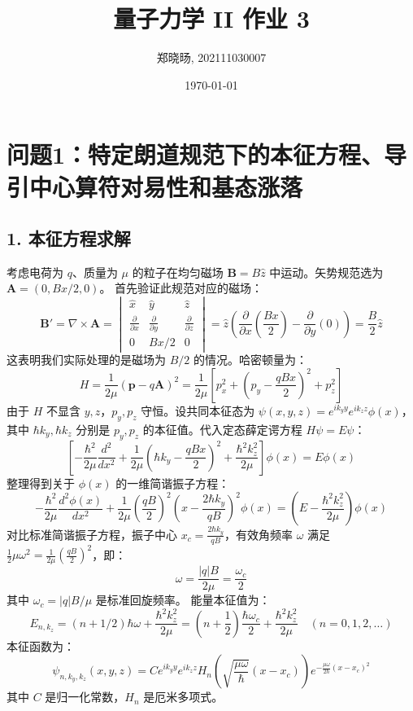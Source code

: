 \documentclass[12pt]{article}
\begin{document}
\title{量子力学 II 作业 3}
\author{郑晓旸, 202111030007}
\date{\today}
\maketitle
\section*{问题1：特定朗道规范下的本征方程、导引中心算符对易性和基态涨落}

\subsection*{1. 本征方程求解}
考虑电荷为 \(q\)、质量为 \(\mu\) 的粒子在均匀磁场 \(\mathbf{B} = B \hat{z}\) 中运动。矢势规范选为 \(\mathbf{A} = (0, Bx/2, 0)\)。
首先验证此规范对应的磁场：
\[
\mathbf{B'} = \nabla \times \mathbf{A} = \begin{vmatrix} \hat{x} & \hat{y} & \hat{z} \\ \frac{\partial}{\partial x} & \frac{\partial}{\partial y} & \frac{\partial}{\partial z} \\ 0 & Bx/2 & 0 \end{vmatrix} = \hat{z} \left( \frac{\partial}{\partial x} \left(\frac{Bx}{2}\right) - \frac{\partial}{\partial y}(0) \right) = \frac{B}{2} \hat{z}
\]
这表明我们实际处理的是磁场为 \(B/2\) 的情况。哈密顿量为：
\[
H = \frac{1}{2\mu} (\mathbf{p} - q\mathbf{A})^2 = \frac{1}{2\mu} \left[ p_x^2 + \left(p_y - \frac{qBx}{2}\right)^2 + p_z^2 \right]
\]
由于 \(H\) 不显含 \(y, z\)，\(p_y, p_z\) 守恒。设共同本征态为 \(\psi(x, y, z) = e^{i k_y y} e^{i k_z z} \phi(x)\)，其中 \(\hbar k_y, \hbar k_z\) 分别是 \(p_y, p_z\) 的本征值。代入定态薛定谔方程 \(H\psi = E\psi\)：
\[
\left[ -\frac{\hbar^2}{2\mu} \frac{d^2}{dx^2} + \frac{1}{2\mu} \left(\hbar k_y - \frac{qBx}{2}\right)^2 + \frac{\hbar^2 k_z^2}{2\mu} \right] \phi(x) = E \phi(x)
\]
整理得到关于 \(\phi(x)\) 的一维简谐振子方程：
\[
-\frac{\hbar^2}{2\mu} \frac{d^2\phi(x)}{dx^2} + \frac{1}{2\mu} \left(\frac{qB}{2}\right)^2 \left(x - \frac{2\hbar k_y}{qB}\right)^2 \phi(x) = \left( E - \frac{\hbar^2 k_z^2}{2\mu} \right) \phi(x)
\]
对比标准简谐振子方程，振子中心 \(x_c = \frac{2\hbar k_y}{qB}\)，有效角频率 \(\omega\) 满足 \(\frac{1}{2}\mu\omega^2 = \frac{1}{2\mu}(\frac{qB}{2})^2\)，即：
\[
\omega = \frac{|q|B}{2\mu} = \frac{\omega_c}{2}
\]
其中 \(\omega_c = |q|B/\mu\) 是标准回旋频率。
能量本征值为：
\[
E_{n, k_z} = (n + 1/2)\hbar \omega + \frac{\hbar^2 k_z^2}{2\mu} = \left(n + \frac{1}{2}\right) \frac{\hbar \omega_c}{2} + \frac{\hbar^2 k_z^2}{2\mu} \quad (n = 0, 1, 2, \dots)
\]
本征函数为：
\[
\psi_{n, k_y, k_z}(x, y, z) = C e^{i k_y y} e^{i k_z z} H_n\left(\sqrt{\frac{\mu\omega}{\hbar}}(x - x_c)\right) e^{-\frac{\mu\omega}{2\hbar}(x - x_c)^2}
\]
其中 \(C\) 是归一化常数，\(H_n\) 是厄米多项式。
\end{document}
